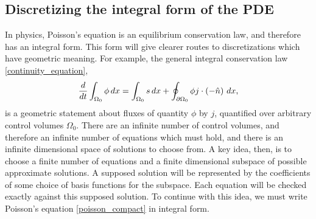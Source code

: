 
\subsection{Discretizing the integral form of the PDE}
In physics, Poisson's equation is an equilibrium conservation law, and therefore has an integral form.
This form will give clearer routes to discretizations which
have geometric meaning.
For example, the general integral conservation law \eqref{continuity_equation},
\begin{align*}
    \frac{d}{dt} \int_{\Omega_0} \phi\,dx = \int_{\Omega_0} s\,dx + \oint_{{\partial\Omega_0}} \phi j \cdot \left(-\hat{n}\right)\,dx,
\end{align*}
is a geometric statement about fluxes
of quantity $\phi$ by $j$, quantified over arbitrary control volumes $\Omega_0$.
There are an infinite number of control volumes, and therefore an infinite number of equations which must hold, and there is an infinite dimensional
space of solutions to choose from. A key idea, then, is to choose a finite number of equations and a finite dimensional subspace of possible approximate solutions.
A supposed solution will be represented by the coefficients of some choice of basis functions for the subspace. Each equation will be checked exactly against this supposed solution.
To continue with this idea, we must write Poisson's equation \eqref{poisson_compact} in integral form.

% 

